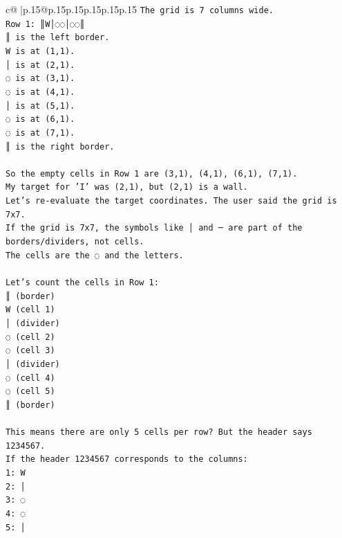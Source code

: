 \documentclass{article}
\begin{document}
{\begin{supertabular}{c@{$\;$}|p{.15\linewidth}@{}p{.15\linewidth}p{.15\linewidth}p{.15\linewidth}p{.15\linewidth}p{.15\linewidth}}
{{{\texttt{The grid is 7 columns wide.} \\
\texttt{Row 1: ║W│◌◌│◌◌║} \\
\texttt{║ is the left border.} \\
\texttt{W is at (1,1).} \\
\texttt{│ is at (2,1).} \\
\texttt{◌ is at (3,1).} \\
\texttt{◌ is at (4,1).} \\
\texttt{│ is at (5,1).} \\
\texttt{◌ is at (6,1).} \\
\texttt{◌ is at (7,1).} \\
\texttt{║ is the right border.} \\
\\ 
\texttt{So the empty cells in Row 1 are (3,1), (4,1), (6,1), (7,1).} \\
\texttt{My target for 'I' was (2,1), but (2,1) is a wall.} \\
\texttt{Let's re{-}evaluate the target coordinates. The user said the grid is 7x7.} \\
\texttt{If the grid is 7x7, the symbols like │ and ─ are part of the borders/dividers, not cells.} \\
\texttt{The cells are the ◌ and the letters.} \\
\\ 
\texttt{Let's count the cells in Row 1:} \\
\texttt{║ (border)} \\
\texttt{W (cell 1)} \\
\texttt{│ (divider)} \\
\texttt{◌ (cell 2)} \\
\texttt{◌ (cell 3)} \\
\texttt{│ (divider)} \\
\texttt{◌ (cell 4)} \\
\texttt{◌ (cell 5)} \\
\texttt{║ (border)} \\
\\ 
\texttt{This means there are only 5 cells per row? But the header says 1234567.} \\
\texttt{If the header 1234567 corresponds to the columns:} \\
\texttt{1: W} \\
\texttt{2: │} \\
\texttt{3: ◌} \\
\texttt{4: ◌} \\
\texttt{5: │} \\
}}}
\end{supertabular}}
\end{document}
